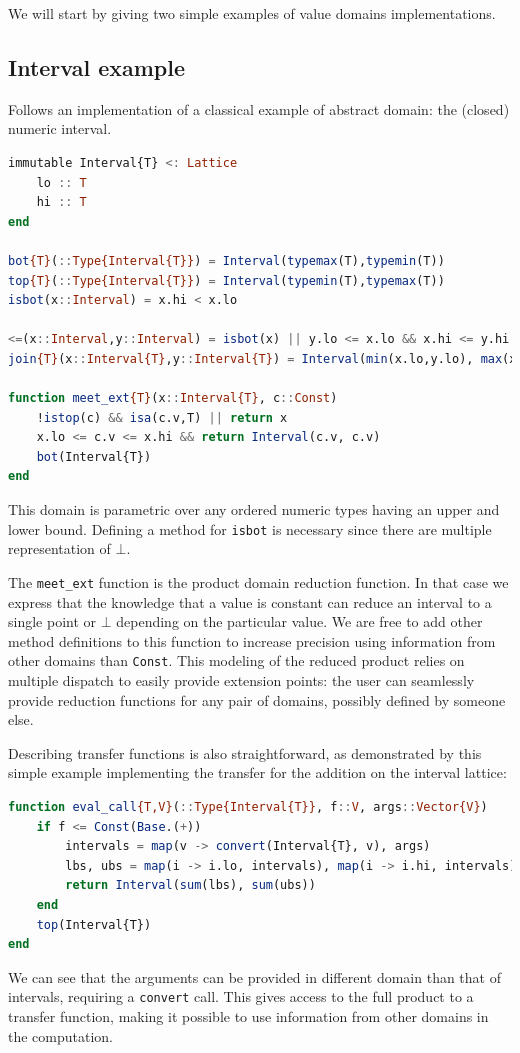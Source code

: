 \documentclass[11pt]{article}
\begin{document}
We will start by giving two simple examples of value domains implementations.

\subsection*{Interval example}
Follows an implementation of a classical example of abstract domain: the (closed) numeric interval.
\begin{singlespace}
\begin{lstlisting}[language=julia]
immutable Interval{T} <: Lattice
    lo :: T
    hi :: T
end

bot{T}(::Type{Interval{T}}) = Interval(typemax(T),typemin(T))
top{T}(::Type{Interval{T}}) = Interval(typemin(T),typemax(T))
isbot(x::Interval) = x.hi < x.lo

<=(x::Interval,y::Interval) = isbot(x) || y.lo <= x.lo && x.hi <= y.hi
join{T}(x::Interval{T},y::Interval{T}) = Interval(min(x.lo,y.lo), max(x.hi,y.hi))

function meet_ext{T}(x::Interval{T}, c::Const)
    !istop(c) && isa(c.v,T) || return x
    x.lo <= c.v <= x.hi && return Interval(c.v, c.v)
    bot(Interval{T})
end
\end{lstlisting}
\end{singlespace}

This domain is parametric over any ordered numeric types having an upper and lower bound. Defining a method for \verb~isbot~ is necessary since there are multiple representation of $\bot$.

The \verb~meet_ext~ function is the product domain reduction function. In that case we express that the knowledge that a value is constant can reduce an interval to a single point or $\bot$ depending on the particular value. We are free to add other method definitions to this function to increase precision using information from other domains than \verb~Const~. This modeling of the reduced product relies on multiple dispatch to easily provide extension points: the user can seamlessly provide reduction functions for any pair of domains, possibly defined by someone else.

Describing transfer functions is also straightforward, as demonstrated by this simple example implementing the transfer for the addition on the interval lattice:
\begin{singlespace}
\begin{lstlisting}[language=julia]
function eval_call{T,V}(::Type{Interval{T}}, f::V, args::Vector{V})
    if f <= Const(Base.(+))
        intervals = map(v -> convert(Interval{T}, v), args)
        lbs, ubs = map(i -> i.lo, intervals), map(i -> i.hi, intervals)
        return Interval(sum(lbs), sum(ubs))
    end
    top(Interval{T})
end
\end{lstlisting}
\end{singlespace}
We can see that the arguments can be provided in different domain than that of intervals, requiring a \verb~convert~ call. This gives access to the full product to a transfer function, making it possible to use information from other domains in the computation.
\end{document}
